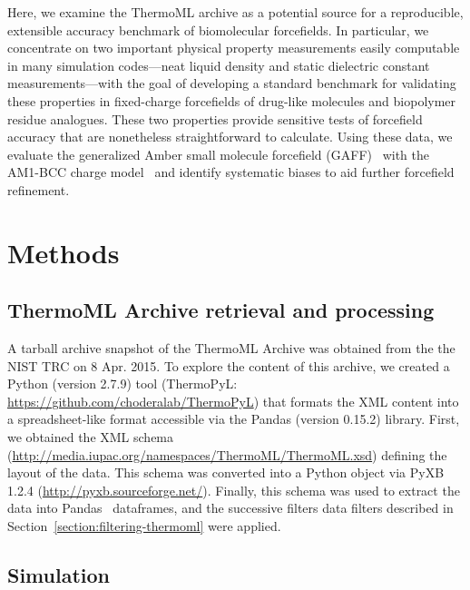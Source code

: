 \documentclass[aps,pre,twocolumn,nofootinbib,superscriptaddress,linenumbers]{revtex4-1}
\begin{document}
Here, we examine the ThermoML archive as a potential source for a reproducible, extensible accuracy benchmark of biomolecular forcefields.
In particular, we concentrate on two important physical property measurements easily computable in many simulation codes---neat liquid density and static dielectric constant measurements---with the goal of developing a standard benchmark for validating these properties in fixed-charge forcefields of drug-like molecules and biopolymer residue analogues.  
These two properties provide sensitive tests of forcefield accuracy that are nonetheless straightforward to calculate.  
Using these data, we evaluate the generalized Amber small molecule forcefield (GAFF)~\cite{gaff,gaff2} with the AM1-BCC charge model~\cite{am1bcc1,am1bcc2} and identify systematic biases to aid further forcefield refinement.





\section{Methods}
\label{section:methods}

\subsection{ThermoML Archive retrieval and processing}
\label{section:thermoml-archive-retrieval}

A tarball archive snapshot of the ThermoML Archive was obtained from the the NIST TRC on 8 Apr. 2015.
To explore the content of this archive, we created a Python (version 2.7.9) tool (ThermoPyL: \url{https://github.com/choderalab/ThermoPyL}) that formats the XML content into a spreadsheet-like format accessible via the Pandas (version 0.15.2) library.  
First, we obtained the XML schema (\url{http://media.iupac.org/namespaces/ThermoML/ThermoML.xsd}) defining the layout of the data.
This schema was converted into a Python object via PyXB 1.2.4 (\url{http://pyxb.sourceforge.net/}).
Finally, this schema was used to extract the data into Pandas~\cite{pandas} dataframes, and the successive filters data filters described in Section~\ref{section:filtering-thermoml} were applied.  

\subsection{Simulation}
\label{section:simulation}
\end{document}

